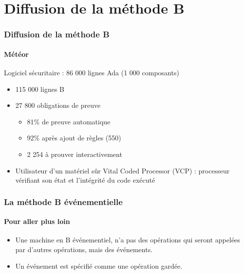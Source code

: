 \documentclass[11pt,a4paper,xcolor=table]{beamer} %
\begin{document}
\section{Diffusion de la méthode B}
\begin{frame}
\frametitle{Diffusion de la méthode B}
\framesubtitle{Météor}
Logiciel sécuritaire : 86 000 lignes Ada (1 000
composants)
\begin{itemize}
\item 115 000 lignes B
\item 27 800 obligations de preuve
\begin{itemize}
\item 81\% de preuve automatique
\item 92\% après ajout de règles (550)
\item 2 254 à prouver interactivement
\end{itemize}
\item Utilisateur d'un matériel sûr Vital Coded Processor (VCP) : processeur vérifiant son état et l'intégrité du code exécuté
\end{itemize}
\end{frame}

\begin{frame}
\frametitle{La méthode B événementielle}
\framesubtitle{Pour aller plus loin}
\begin{itemize}
\item Une machine en B  événementiel, n'a pas des opérations qui seront appelées par d'autres opérations, mais des  événements.
\item Un  événement est spécifié comme une opération gardée.
\end{itemize}

\end{frame}
\end{document}
